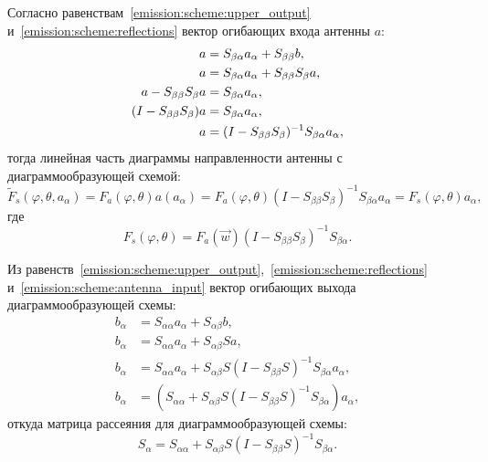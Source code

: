 Согласно равенствам~\eqref{emission:scheme:upper_output} и~\eqref{emission:scheme:reflections} вектор огибающих входа антенны $a$:
\begin{align}
    a                                 & = S_{\beta \alpha} a_\alpha + S_{\beta \beta} b , \notag                                                 \\
    a                                 & = S_{\beta \alpha} a_\alpha + S_{\beta \beta} S_\beta a , \notag                                         \\
    a - S_{\beta \beta} S_\beta a     & = S_{\beta \alpha} a_\alpha , \notag                                                                     \\
    ( I - S_{\beta \beta} S_\beta ) a & = S_{\beta \alpha} a_\alpha , \notag                                                                     \\
    a                                 & = ( I - S_{\beta \beta} S_\beta )^{-1} S_{\beta \alpha} a_\alpha , \label{emission:scheme:antenna_input}
\end{align}
тогда линейная часть диаграммы направленности антенны с диаграммообразующей схемой:
\[
    \widetilde{F}_s(\varphi, \theta, a_\alpha)
    = F_a(\varphi, \theta) a(a_\alpha)
    = F_a(\varphi, \theta) ( I - S_{\beta \beta} S_\beta )^{-1} S_{\beta \alpha} a_\alpha
    = F_s(\varphi, \theta) a_\alpha,
\]
где
\[
    F_s(\varphi, \theta) = F_a(\vec{w}) ( I - S_{\beta \beta} S_\beta )^{-1} S_{\beta \alpha} .
\]

Из равенств~\eqref{emission:scheme:upper_output},~\eqref{emission:scheme:reflections} и~\eqref{emission:scheme:antenna_input} вектор огибающих выхода
диаграммообразующей схемы:
\begin{align*}
    b_\alpha & = S_{\alpha \alpha} a_\alpha + S_{\alpha \beta} b ,                                                          \\
    b_\alpha & = S_{\alpha \alpha} a_\alpha + S_{\alpha \beta} S a ,                                                        \\
    b_\alpha & = S_{\alpha \alpha} a_\alpha + S_{\alpha \beta} S ( I - S_{\beta \beta} S )^{-1} S_{\beta \alpha} a_\alpha , \\
    b_\alpha & = ( S_{\alpha \alpha} + S_{\alpha \beta} S ( I - S_{\beta \beta} S )^{-1} S_{\beta \alpha} ) a_\alpha ,
\end{align*}
откуда матрица рассеяния для диаграммообразующей схемы:
\[
    S_\alpha = S_{\alpha \alpha} + S_{\alpha \beta} S ( I - S_{\beta \beta} S )^{-1} S_{\beta \alpha} .
\]
